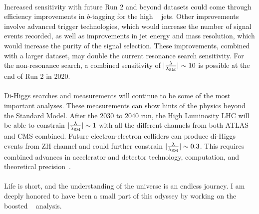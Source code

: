 \paragraph{}
Increased sensitivity with future Run 2 and beyond datasets could come through efficiency improvements in $b$-tagging for the high \pt~ jets.
Other improvements involve advanced trigger technologies, which would increase the number of signal events recorded, as well as improvements in jet energy and mass resolution, which would increase the purity of the signal selection.
These improvements, combined with a larger dataset, may double the current resonance search sensitivity. 
For the non-resonance search, a combined sensitivity of $|\frac{\rm\lambda}{\rm\lambda_{SM}}| \sim 10$ is possible at the end of Run 2 in 2020.

\paragraph{}
Di-Higgs searches and measurements will continue to be some of the most important analyses. 
These measurements can show hints of the physics beyond the Standard Model. 
After the 2030 to 2040 run, the High Luminosity LHC will be able to constrain $|\frac{\rm\lambda}{\rm\lambda_{SM}}| \sim 1$ with all the different channels from both ATLAS and CMS combined.
Future electron-electron colliders can produce di-Higgs events from ZH channel and could further constrain $|\frac{\rm\lambda}{\rm\lambda_{SM}}| \sim 0.3$.
This requires combined advances in accelerator and detector technology, computation, and theoretical precision~\cite{Richter:2014pga, Hawking:2018tcn}.

\paragraph{}
Life is short, and the understanding of the universe is an endless journey. 
I am deeply honored to have been a small part of this odyssey by working on the boosted \pptofourb~ analysis.
